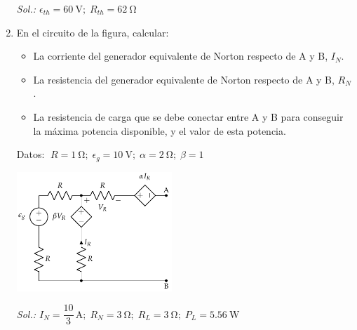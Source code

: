 \begin{enumerate}
    \emph{Sol.:\; $\epsilon_{th}=\qty{60}{\volt};\;R_{th}=\qty{62}{\ohm}$}

  \item En el circuito de la figura, calcular:
    \begin{itemize}
    \item La corriente del generador equivalente de Norton respecto de
      A y B, $I_N$.
    \item La resistencia del generador equivalente de Norton respecto
      de A y B, $R_N$.
    \item La resistencia de carga que se debe conectar entre A y B
      para conseguir la máxima potencia disponible, y el valor de esta
      potencia.
    \end{itemize}
    Datos:
    $\; R = \qty{1}{\ohm};\; \epsilon_g = \qty{10}{\volt};\; \alpha = \qty{2}{\ohm};\; \beta = 1$

    \begin{center}
      \includegraphics[height=4.5cm]{../figs/norton.pdf}
    \end{center}


\emph{Sol.:\;
  $I_N=\dfrac{10}{3}\,\si{\ampere};\; R_N=\qty{3}{\ohm};\; R_L=\qty{3}{\ohm};\;
  P_L=\qty{5.56}{\watt}$}

\end{enumerate}

